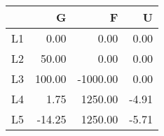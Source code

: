 \begin{table}[ht]
\centering
\begin{tabular}{rrrr}
  \hline
 & G & F & U \\ 
  \hline
L1 & 0.00 & 0.00 & 0.00 \\ 
  L2 & 50.00 & 0.00 & 0.00 \\ 
  L3 & 100.00 & -1000.00 & 0.00 \\ 
  L4 & 1.75 & 1250.00 & -4.91 \\ 
  L5 & -14.25 & 1250.00 & -5.71 \\ 
   \hline
\end{tabular}
\end{table}
